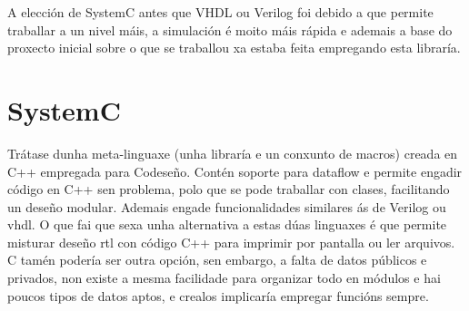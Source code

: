 A elección de SystemC antes que VHDL ou Verilog foi debido a que permite traballar a un nivel máis, a simulación é moito máis rápida e ademais a base do proxecto inicial sobre o que se traballou xa estaba feita empregando esta libraría.

\section{SystemC}\label{sec:systemc}
Trátase dunha meta-linguaxe (unha libraría e un conxunto de macros) creada en C++ empregada para Codeseño. Contén soporte para dataflow e permite engadir código en C++ sen problema, polo que se pode traballar con clases, facilitando un deseño modular. Ademais engade funcionalidades similares ás de Verilog ou \acrshort{vhdl}. O que fai que sexa unha alternativa a estas dúas linguaxes é que permite misturar deseño \acrshort{rtl} con código C++ para imprimir por pantalla ou ler arquivos. C tamén podería ser outra opción, sen embargo, a falta de datos públicos e privados, non existe a mesma facilidade para organizar todo en módulos e hai poucos tipos de datos aptos, e crealos implicaría empregar funcións sempre.
